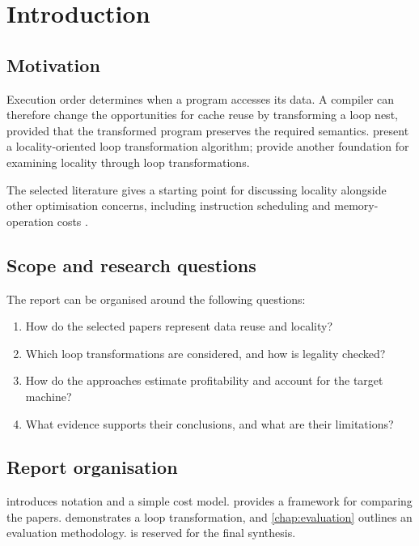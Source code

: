 \chapter{Introduction}
\label{chap:introduction}

\section{Motivation}
Execution order determines when a program accesses its data. A compiler can
therefore change the opportunities for cache reuse by transforming a loop nest,
provided that the transformed program preserves the required semantics.
\citet{wolfLam1991locality} present a locality-oriented loop transformation
algorithm; \citet{mckinleyCarrTseng1996} provide another foundation for examining
locality through loop transformations.


The selected literature gives a starting point for discussing locality alongside
other optimisation concerns, including instruction scheduling and memory-operation
costs \citep{wolfMaydanChen1996,carr1996,carrKennedy1994}.

\section{Scope and research questions}
The report can be organised around the following questions:
\begin{enumerate}
  \item How do the selected papers represent data reuse and locality?
  \item Which loop transformations are considered, and how is legality checked?
  \item How do the approaches estimate profitability and account for the target machine?
  \item What evidence supports their conclusions, and what are their limitations?
\end{enumerate}

\section{Report organisation}
 introduces notation and a simple cost model.
 provides a framework for comparing the papers.
 demonstrates a loop transformation, and
\cref{chap:evaluation} outlines an evaluation methodology.
 is reserved for the final synthesis.
